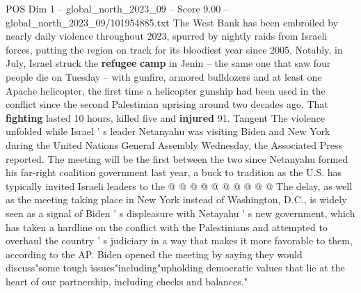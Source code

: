 \begin{textsample}{POS Dim 1 – global\_north\_2023\_09 – Score 9.00 – global\_north\_2023\_09/101954885.txt}
The West Bank has been embroiled by nearly daily violence throughout 2023, spurred by nightly raids from Israeli forces, putting the region on track for its bloodiest year since 2005.
Notably, in July, Israel struck the \textbf{refugee} \textbf{camp} in Jenin -- the same one that saw four people die on Tuesday -- with gunfire, armored bulldozers and at least one Apache helicopter, the first time a helicopter gunship had been used in the conflict since the second Palestinian uprising around two decades ago.
That \textbf{fighting} lasted 10 hours, killed five and \textbf{injured} 91.
Tangent The violence unfolded while Israel ' s leader Netanyahu was visiting Biden and New York during the United Nations General Assembly Wednesday, the Associated Press reported.
The meeting will be the first between the two since Netanyahu formed his far-right coalition government last year, a buck to tradition as the U.S. has typically invited Israeli leaders to the @ @ @ @ @ @ @ @ @ @ The delay, as well as the meeting taking place in New York instead of Washington, D.C., is widely seen as a signal of Biden ' s displeasure with Netayahu ' s new government, which has taken a hardline on the conflict with the Palestinians and attempted to overhaul the country ' s judiciary in a way that makes it more favorable to them, according to the AP.
Biden opened the meeting by saying they would discuss"some tough issues"including"upholding democratic values that lie at the heart of our partnership, including checks and balances."

\end{textsample}
